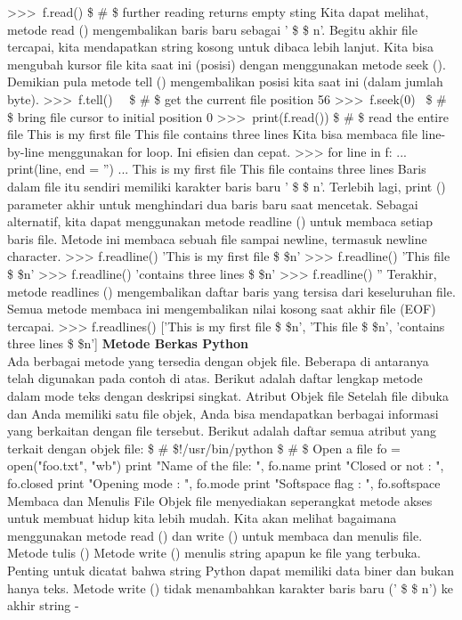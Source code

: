 >>>~f.read()   \$  \#  \$ further reading returns empty sting 
Kita dapat melihat, metode read () mengembalikan baris baru sebagai ' \$  \setminus  \$ n'. Begitu akhir file tercapai, kita mendapatkan string kosong untuk dibaca lebih lanjut. Kita bisa mengubah kursor file kita saat ini (posisi) dengan menggunakan metode seek (). Demikian pula metode tell () mengembalikan posisi kita saat ini (dalam jumlah byte).  
>>>~f.tell()~~   \$  \#  \$ get the current file position  
56 
>>>~f.seek(0)~   \$  \#  \$ bring file cursor to initial position  
0  
>>>~print(f.read())   \$  \#  \$ read the entire file  
This is my first file  
This file 
contains three lines 
Kita bisa membaca file line-by-line menggunakan for loop. Ini efisien dan cepat. 
>>> for line in f:  
...~~~~ print(line, end = '')  
... 
This is my first file 
This file  
contains three lines 
Baris dalam file itu sendiri memiliki karakter baris baru ' \$  \setminus  \$ n'. Terlebih lagi, print () parameter akhir untuk menghindari dua baris baru saat mencetak. Sebagai alternatif, kita dapat menggunakan metode readline () untuk membaca setiap baris file. Metode ini membaca sebuah file sampai newline, termasuk newline character.
>>> f.readline()  
'This is my first file \$  \setminus  \$n'  
>>> f.readline()  
'This file \$  \setminus  \$n'  
>>> f.readline()  
'contains three lines \$  \setminus  \$n' 
>>> f.readline()  
'' 
Terakhir, metode readlines () mengembalikan daftar baris yang tersisa dari keseluruhan file. Semua metode membaca ini mengembalikan nilai kosong saat akhir file (EOF) tercapai.  
>>> f.readlines()  
['This is my first file \$  \setminus  \$n', 'This file \$  \setminus  \$n', 'contains three lines \$  \setminus  \$n'] 
{\fontsize{14pt}{14pt}\selectfont \textbf{Metode Berkas Python} \\} 
Ada berbagai metode yang tersedia dengan objek file. Beberapa di antaranya telah digunakan pada contoh di atas. Berikut adalah daftar lengkap metode dalam mode teks dengan deskripsi singkat. Atribut Objek file Setelah file dibuka dan Anda memiliki satu file objek, Anda bisa mendapatkan berbagai informasi yang berkaitan dengan file tersebut. Berikut adalah daftar semua atribut yang terkait dengan objek file: 
 \$  \#  \$!/usr/bin/python 
 \$  \#  \$ Open a file  
fo = open("foo.txt", "wb") 
print "Name of the file: ", fo.name 
print "Closed or not : ", fo.closed 
print "Opening mode : ", fo.mode 
print "Softspace flag : ", fo.softspace  
Membaca dan Menulis File 
Objek file menyediakan seperangkat metode akses untuk membuat hidup kita lebih mudah. Kita akan melihat bagaimana menggunakan metode read () dan write () untuk membaca dan menulis file. Metode tulis () Metode write () menulis string apapun ke file yang terbuka. Penting untuk dicatat bahwa string Python dapat memiliki data biner dan bukan hanya teks. Metode write () tidak menambahkan karakter baris baru (' \$  \setminus  \$ n') ke akhir string - 
